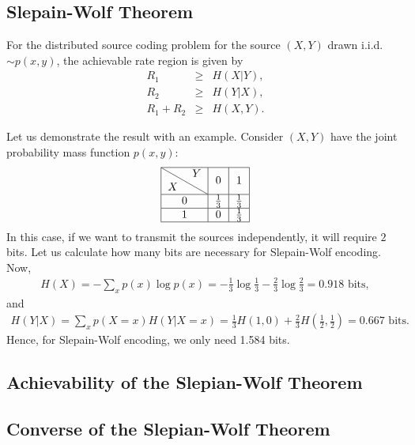 \subsection{Slepain-Wolf Theorem}
%
\begin{tcolorbox}[boxrule=0pt,frame hidden,sharp corners,enhanced, opacityback=0, borderline west={2pt}{0pt}{blue}]
\begin{thm} 
For the distributed source coding problem for the source $(X,Y)$ drawn i.i.d. $\sim p(x,y)$, the achievable rate region is given by
%
\begin{eqnarray}
  R_1 &\geq& H(X|Y), \\
  R_2 &\geq& H(Y|X), \\
  R_1+R_2 &\geq& H(X,Y).
\end{eqnarray}
%
\end{thm}
\end{tcolorbox}
%
Let us demonstrate the result with an example. Consider $(X,Y)$ have the joint probability mass function $p(x,y)$:
%
%
\begin{eqnarray}
   \begin{tabular}{|c|c|c|c|}
        \hline
        \backslashbox{$X$}{$Y$} & 0 & 1 \\
       \hline
        0 & $\frac{1}{3}$ & $\frac{1}{3}$ \\
        \hline
        1 & 0 & $\frac{1}{3}$ \\
        \hline
    \end{tabular}
\end{eqnarray}
%
In this case, if we want to transmit the sources independently, it will require $2$ bits. Let us calculate how many bits are necessary for Slepain-Wolf encoding. Now,
%
\begin{eqnarray}
    H(X) = -\sum_{x} p(x)\log p(x) = -\frac{1}{3}\log\frac{1}{3}-\frac{2}{3}\log\frac{2}{3} = 0.918 \mbox{ bits},
\end{eqnarray}
%
and
%
\begin{eqnarray}
H(Y|X) = \sum_{x} p(X=x)H(Y|X=x) = \frac{1}{3}H(1,0)+\frac{2}{3}H(\frac{1}{2},\frac{1}{2}) = 0.667 \mbox{ bits}.
\end{eqnarray}
%
Hence, for Slepain-Wolf encoding, we only need 1.584 bits.
\subsection{Achievability of the Slepian-Wolf Theorem}
\subsection{Converse of the Slepian-Wolf Theorem}
